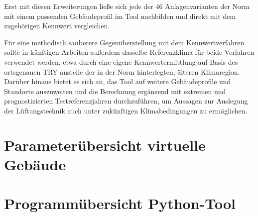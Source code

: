 \documentclass{scrreprt}
\begin{document}
Erst mit diesen Erweiterungen ließe sich jede der 46 Anlagenvarianten
der Norm mit einem passenden Gebäudeprofil im Tool nachbilden und
direkt mit dem zugehörigen Kennwert vergleichen.

Für eine methodisch sauberere Gegenüberstellung mit dem
Kennwertverfahren sollte in künftigen Arbeiten außerdem dasselbe
Referenzklima für beide Verfahren verwendet werden, etwa durch eine
eigene Kennwertermittlung auf Basis des ortsgenauen \ac{TRY} anstelle
der in der Norm hinterlegten, älteren Klimaregion. Darüber hinaus
bietet es sich an, das Tool auf weitere Gebäudeprofile und Standorte
auszuweiten und die Berechnung ergänzend mit extremen und
prognostizierten Testreferenzjahren durchzuführen, um Aussagen zur
Auslegung der Lüftungstechnik auch unter zukünftigen
Klimabedingungen zu ermöglichen.

\printbibliography

\appendix
\chapter{Parameterübersicht virtuelle Gebäude}
\chapter{Programmübersicht Python-Tool}
\end{document}
